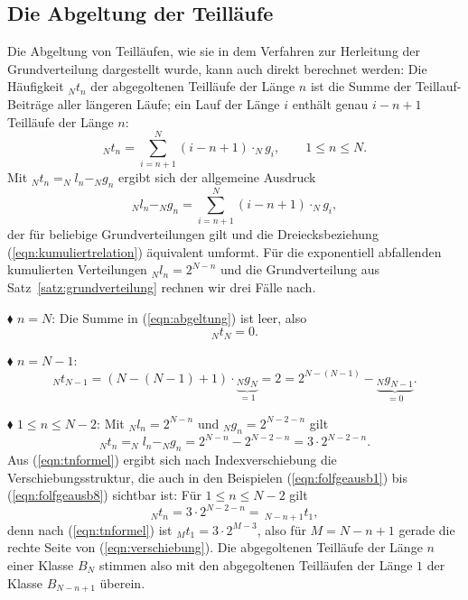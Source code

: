 \documentclass[11pt,a4paper]{scrartcl}
\theoremstyle{plain}
\theoremstyle{definition}
\theoremstyle{remark}
\begin{document}
\subsection{Die Abgeltung der Teilläufe}

Die Abgeltung von Teilläufen, wie sie in dem Verfahren zur Herleitung
der Grundverteilung dargestellt wurde, kann auch direkt berechnet
werden: Die Häufigkeit $_Nt_n$ der abgegoltenen Teilläufe der Länge $n$
ist die Summe der Teillauf-Beiträge aller längeren Läufe; ein Lauf der
Länge $i$ enthält genau $i-n+1$ Teilläufe der Länge $n$:
\begin{equation}\label{eqn:abgeltung}
  _Nt_n=\sum_{i=n+1}^{N}\left(i-n+1\right)\cdot _Ng_i,\qquad 1\leq n\leq N.
\end{equation}
Mit $_Nt_n = _Nl_n - _Ng_n$ ergibt sich der allgemeine Ausdruck
\begin{equation}\label{eqn:abgegoltete}
  _Nl_n - _Ng_n=\sum_{i=n+1}^{N}\left(i-n+1\right)\cdot _Ng_i,
\end{equation}
der für beliebige Grundverteilungen gilt und die Dreiecksbeziehung
(\ref{eqn:kumuliertrelation}) äquivalent umformt. Für die exponentiell
abfallenden kumulierten Verteilungen $_Nl_n=2^{N-n}$ und die
Grundverteilung aus Satz~\ref{satz:grundverteilung} rechnen wir drei
Fälle nach.

\noindent$\blacklozenge$ $n=N$: Die Summe in (\ref{eqn:abgeltung}) ist
leer, also
\begin{equation}
  _Nt_N=0.
\end{equation}

\noindent$\blacklozenge$ $n=N-1$:
\begin{equation}
  _Nt_{N-1}=\left(N-(N-1)+1\right)\cdot\underbrace{_Ng_N}_{=1}=2
  =2^{N-(N-1)}-\underbrace{_Ng_{N-1}}_{=0}.
\end{equation}

\noindent$\blacklozenge$ $1\leq n\leq N-2$: Mit $_Nl_n=2^{N-n}$ und
$_Ng_n=2^{N-2-n}$ gilt
\begin{equation}\label{eqn:tnformel}
  _Nt_n=_Nl_n-_Ng_n=2^{N-n}-2^{N-2-n}=3\cdot 2^{N-2-n}.
\end{equation}
Aus (\ref{eqn:tnformel}) ergibt sich nach Indexverschiebung die
Verschiebungsstruktur, die auch in den Beispielen
(\ref{eqn:folfgeausb1}) bis (\ref{eqn:folfgeausb8}) sichtbar ist: Für
$1\leq n\leq N-2$ gilt
\begin{equation}\label{eqn:verschiebung}
  _Nt_n=3\cdot 2^{N-2-n}=\,_{N-n+1}t_1,
\end{equation}
denn nach (\ref{eqn:tnformel}) ist $_Mt_1=3\cdot 2^{M-3}$, also für
$M=N-n+1$ gerade die rechte Seite von (\ref{eqn:verschiebung}). Die
abgegoltenen Teilläufe der Länge $n$ einer Klasse $B_N$ stimmen also
mit den abgegoltenen Teilläufen der Länge $1$ der Klasse $B_{N-n+1}$
überein.
\end{document}
